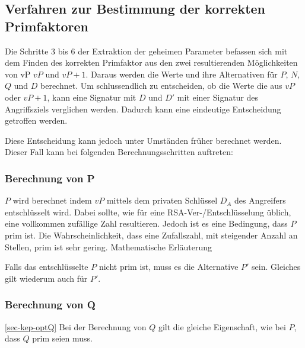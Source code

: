        \subsection{Verfahren zur Bestimmung der korrekten Primfaktoren}
            Die Schritte 3 bis 6 der Extraktion der geheimen Parameter befassen sich mit dem Finden des korrekten Primfaktor aus den zwei resultierenden Möglichkeiten von vP $vP$ und $vP+1$. Daraus werden die Werte und ihre Alternativen für $P$, $N$, $Q$ und $D$ berechnet. 
            Um schlussendlich zu entscheiden, ob die Werte die aus $vP$ oder $vP+1$, kann eine Signatur mit $D$ und $D'$ mit einer Signatur des Angriffsziels verglichen werden. Dadurch kann eine eindeutige Entscheidung getroffen werden. 

            Diese Entscheidung kann jedoch unter Umständen früher berechnet werden. Dieser Fall kann bei folgenden Berechnungsschritten  auftreten:

            \subsubsection{Berechnung von P}
                $P$ wird berechnet indem $vP$ mittels dem privaten Schlüssel $D_{A}$ des Angreifers entschlüsselt wird. Dabei sollte, wie für eine \ac{RSA}-Ver-/Entschlüsselung üblich, eine vollkommen zufällige Zahl resultieren. Jedoch ist es eine Bedingung, dass $P$ prim ist. 
                Die Wahrscheinlichkeit, dass eine Zufallszahl, mit steigender Anzahl an Stellen, prim ist sehr gering. 
                Mathematische Erläuterung %

                Falls das entschlüsselte $P$ nicht prim ist, muss es die Alternative $P'$ sein. Gleiches gilt wiederum auch für $P'$.

            \subsubsection{Berechnung von Q} \ref{sec-kep-optQ}
                Bei der Berechnung von $Q$ gilt die gleiche Eigenschaft, wie bei $P$, dass $Q$ prim seien muss.

